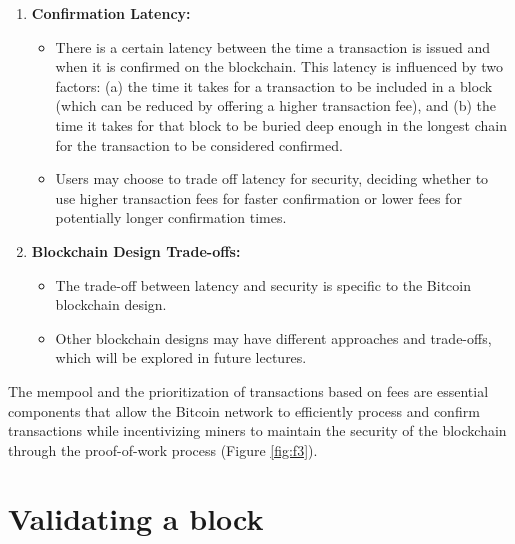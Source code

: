 \begin{enumerate}
\begin{itemize}
    \end{itemize}
    \item \textbf{Confirmation Latency:}
    \begin{itemize}
        \item There is a certain latency between the time a transaction is issued and when it is confirmed on the blockchain. This latency is influenced by two factors: (a) the time it takes for a transaction to be included in a block (which can be reduced by offering a higher transaction fee), and (b) the time it takes for that block to be buried deep enough in the longest chain for the transaction to be considered confirmed.
        \item Users may choose to trade off latency for security, deciding whether to use higher transaction fees for faster confirmation or lower fees for potentially longer confirmation times.
    \end{itemize}
    \item \textbf{Blockchain Design Trade-offs:}
    \begin{itemize}
        \item The trade-off between latency and security is specific to the Bitcoin blockchain design.
        \item Other blockchain designs may have different approaches and trade-offs, which will be explored in future lectures.
    \end{itemize}
\end{enumerate}
The mempool and the prioritization of transactions based on fees are essential components that allow the Bitcoin network to efficiently process and confirm transactions while incentivizing miners to maintain the security of the blockchain through the proof-of-work process (Figure \ref{fig:f3}).

\section{Validating a block}
